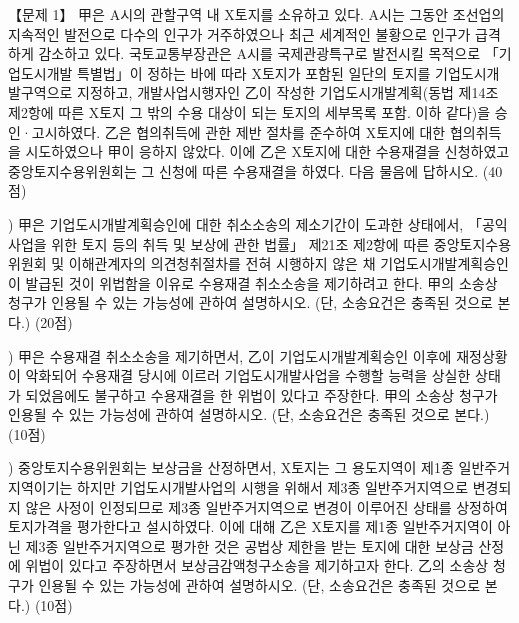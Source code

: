 \begin{longquestion}{【문제 1】}
甲은 A시의 관할구역 내 X토지를 소유하고 있다. A시는 그동안 조선업의 지속적인 발전으로 다수의 인구가 거주하였으나 최근 세계적인 불황으로 인구가 급격하게 감소하고 있다. 국토교통부장관은 A시를 국제관광특구로 발전시킬 목적으로 「기업도시개발 특별법」이 정하는 바에 따라 X토지가 포함된 일단의 토지를 기업도시개발구역으로 지정하고, 개발사업시행자인 乙이 작성한 기업도시개발계획(동법 제14조 제2항에 따른 X토지 그 밖의 수용 대상이 되는 토지의 세부목록 포함. 이하 같다)을 승인·고시하였다. 乙은 협의취득에 관한 제반 절차를 준수하여 X토지에 대한 협의취득을 시도하였으나 甲이 응하지 않았다. 이에 乙은 X토지에 대한 수용재결을 신청하였고 중앙토지수용위원회는 그 신청에 따른 수용재결을 하였다. 다음 물음에 답하시오. (40점) \par
\medskip{}) 甲은 기업도시개발계획승인에 대한 취소소송의 제소기간이 도과한 상태에서, 「공익사업을 위한 토지 등의 취득 및 보상에 관한 법률」 제21조 제2항에 따른 중앙토지수용위원회 및 이해관계자의 의견청취절차를 전혀 시행하지 않은 채 기업도시개발계획승인이 발급된 것이 위법함을 이유로 수용재결 취소소송을 제기하려고 한다. 甲의 소송상 청구가 인용될 수 있는 가능성에 관하여 설명하시오. (단, 소송요건은 충족된 것으로 본다.) (20점) \par
\medskip{}) 甲은 수용재결 취소소송을 제기하면서, 乙이 기업도시개발계획승인 이후에 재정상황이 악화되어 수용재결 당시에 이르러 기업도시개발사업을 수행할 능력을 상실한 상태가 되었음에도 불구하고 수용재결을 한 위법이 있다고 주장한다. 甲의 소송상 청구가 인용될 수 있는 가능성에 관하여 설명하시오. (단, 소송요건은 충족된 것으로 본다.) (10점) \par
\medskip{}) 중앙토지수용위원회는 보상금을 산정하면서, X토지는 그 용도지역이 제1종 일반주거지역이기는 하지만 기업도시개발사업의 시행을 위해서 제3종 일반주거지역으로 변경되지 않은 사정이 인정되므로 제3종 일반주거지역으로 변경이 이루어진 상태를 상정하여 토지가격을 평가한다고 설시하였다. 이에 대해 乙은 X토지를 제1종 일반주거지역이 아닌 제3종 일반주거지역으로 평가한 것은 공법상 제한을 받는 토지에 대한 보상금 산정에 위법이 있다고 주장하면서 보상금감액청구소송을 제기하고자 한다. 乙의 소송상 청구가 인용될 수 있는 가능성에 관하여 설명하시오. (단, 소송요건은 충족된 것으로 본다.) (10점) \par

\end{longquestion}
